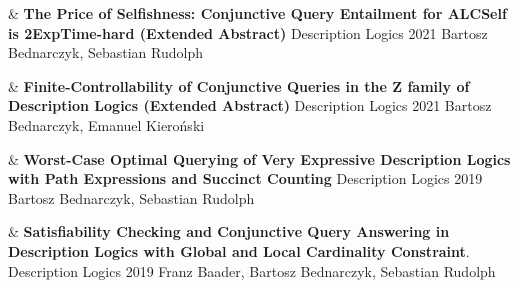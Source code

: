 \documentclass[10pt,a4paper]{article}
\begin{document}
\begin{EntriesTableYear}
  &
  \textbf{The Price of Selfishness: Conjunctive Query Entailment for ALCSelf is 2ExpTime-hard (Extended Abstract)}
  \newline
  Description Logics 2021
  \newline
 Bartosz Bednarczyk, Sebastian Rudolph
  \\
\end{EntriesTableYear}

\begin{EntriesTableYear}
  &
  \textbf{Finite-Controllability of Conjunctive Queries in the Z family of Description Logics (Extended Abstract)}
  \newline
  Description Logics 2021
  \newline
 Bartosz Bednarczyk, Emanuel Kieroński
  \\
\end{EntriesTableYear}

\begin{EntriesTableYear}
  &
  \textbf{Worst-Case Optimal Querying of Very Expressive Description Logics with Path Expressions and Succinct Counting}
  \newline
  Description Logics 2019
  \newline
 Bartosz Bednarczyk, Sebastian Rudolph
  \\
\end{EntriesTableYear}

\begin{EntriesTableYear}
  &
  \textbf{
Satisfiability Checking and Conjunctive Query Answering in Description Logics with Global and Local Cardinality Constraint}.
  \newline
  Description Logics 2019
  \newline
 Franz Baader, Bartosz Bednarczyk, Sebastian Rudolph
  \\
\end{EntriesTableYear}
\end{document}
